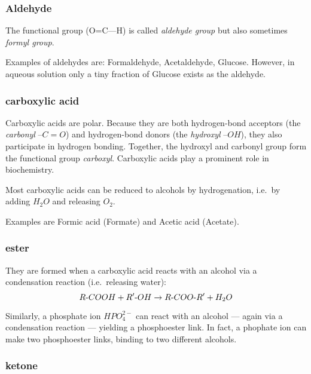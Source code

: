 \documentclass[a4paper,14pt]{extarticle}
\def\mhyphen{{\hbox{-}}}
\begin{document}
\subsubsection{Aldehyde}


The functional group (O=C---H) is called {\em aldehyde group\/} but also sometimes {\em
formyl group}.

Examples of aldehydes are: Formaldehyde, Acetaldehyde, Glucose. However, in aqueous
solution only a tiny fraction of Glucose exists as the aldehyde.

\subsubsection{carboxylic acid}

Carboxylic acids are polar. Because they are both hydrogen-bond acceptors (the {\em
carbonyl\/} $–C=O$) and hydrogen-bond donors (the {\em hydroxyl\/} $–OH$), they also
participate in hydrogen bonding. Together, the hydroxyl and carbonyl group form the
functional group {\em carboxyl}.
Carboxylic acids play a prominent role in biochemistry.

Most carboxylic acids can be reduced to alcohols by hydrogenation, i.e.\ by adding
$H_2O$ and releasing $O_2$.

Examples are Formic acid (Formate) and Acetic acid (Acetate).

\subsubsection{ester}

They are formed when a carboxylic acid reacts with an alcohol via a condensation reaction
(i.e.\ releasing water):
\[
    R{\mhyphen}COOH + R'{\mhyphen}OH \rightarrow R{\mhyphen}COO{\mhyphen}R' + H_2O
\]

Similarly, a phosphate ion $HPO_4^{2-}$ can react with an alcohol --- again via a
condensation reaction --- yielding a phosphoester link. In fact, a
phophate ion can make two phosphoester links, binding to two different alcohols.

\subsubsection{ketone}
\end{document}
